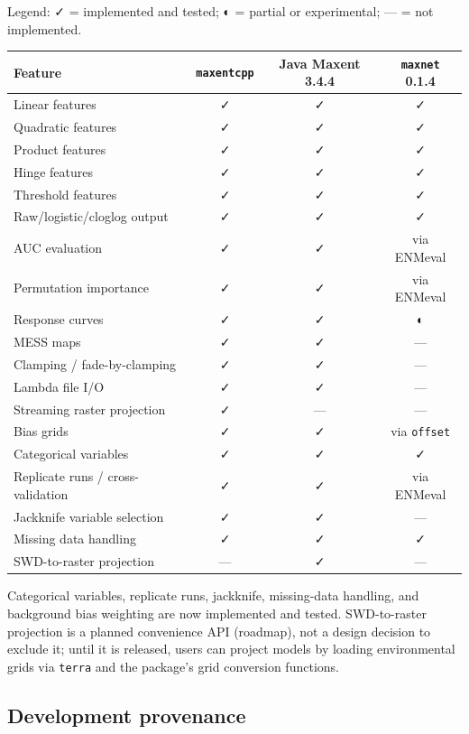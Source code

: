 \documentclass[10pt,letterpaper]{article}
\newcounter{none} %
\begin{document}
Legend: ✓ = implemented and tested; ◐ = partial or experimental; --- =
not implemented.

{\def\LTcaptype{none} %
\begin{longtable}[]{@{}lccc@{}}
\toprule\noalign{}
Feature & \texttt{maxentcpp} & Java Maxent 3.4.4 & \texttt{maxnet}
0.1.4 \\
\midrule\noalign{}
\endhead
\bottomrule\noalign{}
\endlastfoot
Linear features & ✓ & ✓ & ✓ \\
Quadratic features & ✓ & ✓ & ✓ \\
Product features & ✓ & ✓ & ✓ \\
Hinge features & ✓ & ✓ & ✓ \\
Threshold features & ✓ & ✓ & ✓ \\
Raw/logistic/cloglog output & ✓ & ✓ & ✓ \\
AUC evaluation & ✓ & ✓ & via ENMeval \\
Permutation importance & ✓ & ✓ & via ENMeval \\
Response curves & ✓ & ✓ & ◐ \\
MESS maps & ✓ & ✓ & --- \\
Clamping / fade-by-clamping \cite{Phillips2008} & ✓ & ✓ & --- \\
Lambda file I/O & ✓ & ✓ & --- \\
Streaming raster projection & ✓ & --- & --- \\
Bias grids & ✓ & ✓ & via \texttt{offset} \\
Categorical variables & ✓ & ✓ & ✓ \\
Replicate runs / cross-validation & ✓ & ✓ & via ENMeval \\
Jackknife variable selection & ✓ & ✓ & --- \\
Missing data handling & ✓ & ✓ & ✓ \\
SWD-to-raster projection & --- & ✓ & --- \\
\end{longtable}
}

Categorical variables, replicate runs, jackknife, missing-data handling,
and background bias weighting are now implemented and tested.
SWD-to-raster projection is a planned convenience API (roadmap), not a
design decision to exclude it; until it is released, users can project
models by loading environmental grids via \texttt{terra} and the
package's grid conversion functions.

\subsection*{Development provenance}
\end{document}
